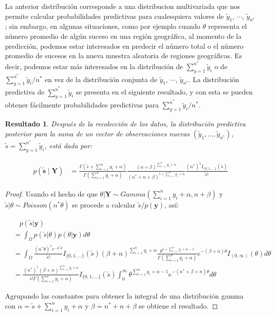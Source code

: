 \documentclass[
  10pt,
  spanish,
]{book}
\newtheorem{proposition}{Resultado}[chapter]
\theoremstyle{definition}
\theoremstyle{definition}
\theoremstyle{definition}
\theoremstyle{definition}
\theoremstyle{remark}
\begin{document}
La anterior distribución corresponde a una distribucion multivariada que nos permite calcular probabilidades predictivas para cualesquiera valores de \(\tilde{y}_1\), \(\cdots\), \(\tilde{y}_{n^*}\); sin embargo, en algunas situaciones, como por ejemplo cuando \(\theta\) representa el número promedio de algún suceso en una región geográfica, al momento de la predicción, podemos estar interesados en predecir el número total o el número promedio de sucesos en la nueva muestra aleatoria de regiones geográficas. Es decir, podemos estar más interesados en la distribución de \(\sum_{y=1}^{n^*} \tilde{y}_i\) o de \(\sum_{y=1}^{n^*} \tilde{y}_i/n^*\) en vez de la distribución conjunta de \(\tilde{y}_1\), \(\cdots\), \(\tilde{y}_{n^*}\). La distribución predictiva de \(\sum_{y=1}^{n^*} \tilde{y}_i\) se presenta en el siguiente resultado, y con esta se pueden obtener fácilmente probabilidades predictivas para \(\sum_{y=1}^{n^*} \tilde{y}_i/n^*\).

\begin{proposition}
\protect\hypertarget{prp:unnamed-chunk-46}{}{\label{prp:unnamed-chunk-46} }Después de la recolección de los datos, la distribución predictiva posterior para la suma de un vector de observaciones nuevas \(\left(\tilde{y}_1,\ldots,\tilde{y}_{n^*}\right)\), \(\tilde{s} = \sum_{y=1}^{n^*} \tilde{y}_i\), está dada por:

\begin{align}
\label{eq:PrePosPoissonSum}
p(\tilde{\mathbf{s}} \mid \mathbf{Y})&=\frac{\Gamma(\tilde{s}+\sum_{i=1}^ny_i+\alpha)}{\Gamma(\sum_{i=1}^ny_i+\alpha)}
\frac{(n+\beta)^{\sum_{i=1}^ny_i+\alpha}}{({n^*}+n+\beta)^{\tilde{s}+\sum_{i=1}^ny_i+\alpha}}\frac{(n^*)^{\tilde{s}}I_{\{0,1,\ldots\}}(\tilde{s})}{\tilde{s}!}
\end{align}
\end{proposition}

\begin{proof}
{}Usando el hecho de que \(\theta|\mathbf{Y}\sim Gamma(\sum_{i=1}^{n}y_i+\alpha,n+\beta)\) y \(\tilde{s}|\theta\sim Poisson(n^*\theta)\) se procede a calcular \(\tilde{s}/p(\mathbf{y})\),
así:

\begin{align*}
&\ \ \ \ p(\tilde{s}|\mathbf{y}) \\
&= \int_{\Omega} p(\tilde{s}|\theta)p(\theta|\mathbf{y})d\theta\\
& = \int_{\Omega} \frac{(n^{*}\theta)^{\tilde{s}}e^{-n^*\theta}}{\tilde{s}!} I_{\{0,1,\ldots\}}(\tilde{s}) (\beta+n)^{\sum_{i=1}^{n}y_i+\alpha}\frac{\theta^{\tilde{s}+\sum_{i=1}^{n}y_i+\alpha-1}}{\Gamma(\sum_{i=1}^{n}y_i+\alpha)}e^{-(\beta+n)\theta}I_{(0,\infty)}(\theta) d\theta\\
&= \frac{(n^*)^{\tilde{s}}(\beta+n)^{\sum_{i=1}^{n}y_i+\alpha}}{\tilde{s}!\Gamma(\sum_{i=1}^{n}y_i+\alpha)}I_{\{0,1,\ldots\}}(\tilde{s})\int_{0}^{\infty}\theta^{\sum_{i=1}^{n}y_i+\alpha-1}e^{-(n^*+\beta+n)\theta}d\theta
\end{align*}

Agrupando las constantes para obtener la integral de una distribución gamma con \(\alpha=\tilde{s}+\sum_{i=1}^{n}y_i+\alpha\) y \(\beta=n^*+n+\beta\) se obtiene el resultado.
\end{proof}
\end{document}
